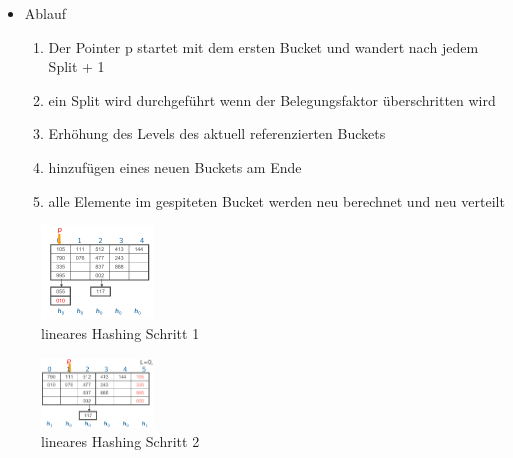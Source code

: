 \documentclass[a4paper]{article}
\begin{document}
\begin{enumerate}
\begin{itemize}
\begin{itemize}
                \item Ablauf
                \begin{enumerate}
                    \item Der Pointer p startet mit dem ersten Bucket und wandert nach jedem Split + 1
                    \item ein Split wird durchgeführt wenn der Belegungsfaktor überschritten wird
                    \item Erhöhung des Levels des aktuell referenzierten Buckets
                    \item hinzufügen eines neuen Buckets am Ende
                    \item alle Elemente im gespiteten Bucket werden neu berechnet und neu verteilt
                \end{enumerate}
            \end{itemize}
            
            \begin{figure} [htp]
                \centering
                \includegraphics[width=3cm]{images/linearesHashing_1.png}
                \caption{lineares Hashing Schritt 1}
                \label{fig:linHashing1}
            \end{figure}
            
            \begin{figure} [htp]
                \centering
                \includegraphics[width=3cm]{images/linearesHashing_2.png}
                \caption{lineares Hashing Schritt 2}
                \label{fig:linHashing2}
            \end{figure}
            

\end{itemize}
\end{enumerate}
\end{document}
